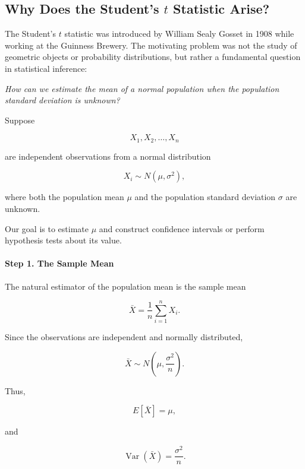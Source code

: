 \documentclass[11pt]{article}
\begin{document}
	\begin{mdframed}[
		linewidth=0.8pt,
		roundcorner=6pt,
		backgroundcolor=gray!5,
		linecolor=gray!60,
		innertopmargin=10pt,
		innerbottommargin=10pt,
		innerleftmargin=10pt,
		innerrightmargin=10pt
		]
		
		\subsection*{Why Does the Student's $t$ Statistic Arise?}
		
		The Student's $t$ statistic was introduced by William Sealy Gosset in 1908
		while working at the Guinness Brewery. The motivating problem was not the
		study of geometric objects or probability distributions, but rather a
		fundamental question in statistical inference:
		
		\begin{center}
			\emph{How can we estimate the mean of a normal population when the
				population standard deviation is unknown?}
		\end{center}
		
		Suppose
		
		\[
		X_1,X_2,\ldots,X_n
		\]
		
		are independent observations from a normal distribution
		
		\[
		X_i\sim N(\mu,\sigma^2),
		\]
		
		where both the population mean $\mu$ and the population standard deviation
		$\sigma$ are unknown.
		
		Our goal is to estimate $\mu$ and construct confidence intervals or perform
		hypothesis tests about its value.
		
		\paragraph{Step 1. The Sample Mean}
		
		The natural estimator of the population mean is the sample mean
		
		\[
		\bar X
		=
		\frac1n
		\sum_{i=1}^{n}X_i.
		\]
		
		Since the observations are independent and normally distributed,
		
		\[
		\bar X
		\sim
		N\left(
		\mu,
		\frac{\sigma^2}{n}
		\right).
		\]
		
		Thus,
		
		\[
		E[\bar X]=\mu,
		\]
		
		and
		
		\[
		\operatorname{Var}(\bar X)
		=
		\frac{\sigma^2}{n}.
		\]
		

\end{mdframed}
\end{document}
